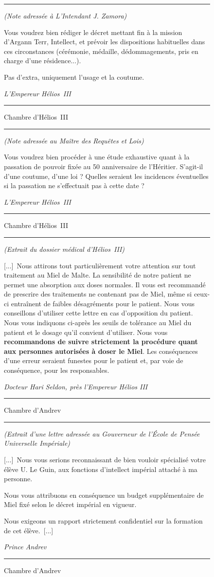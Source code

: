 \documentclass{article}
\newcommand{\newcharacter}{\clearpage\setcounter{figure}{0}}
\newcommand{\indice}[4]{
    \begin{figure}[H]
        \begin{center}
            \rule{0.5\textwidth}{1pt}
        \end{center}
        \begin{framed}
            \begin{samepage}
                \textit{#1}
                \nopagebreak

                #2

                \nopagebreak

                \hfill\textit{#3}
            \end{samepage}
        \end{framed}
        \caption{#4}
        \begin{center}
            \rule{0.5\textwidth}{1pt}
        \end{center}
    \end{figure}
}
\begin{document}
\indice
{(Note adressée à L'Intendant J. Zamora)}
{Vous voudrez bien rédiger le décret mettant fin à la mission d'Argann Terr,
Intellect, et prévoir les dispositions habituelles dans ces circonstances
(cérémonie, médaille, dédommagements, pris en charge d'une résidence...).

\nobreak

Pas d'extra, uniquement l'usage et la coutume.}
{L'Empereur Hélios~III}
{Chambre d'Hélios~III}

\indice
{(Note adressée au Maître des Requêtes et Lois)}
{Vous voudrez bien procéder à une étude exhaustive quant à la passation de
pouvoir fixée au 50\ieme{} anniversaire de l'Héritier. S'agit-il d'une coutume,
d'une loi ? Quelles seraient les incidences éventuelles si la passation
ne s'effectuait pas à cette date ?}
{L'Empereur Hélios~III}
{Chambre d'Hélios~III}

\newcharacter

\indice
{(Extrait du dossier médical d'Hélios~III)}
{[...]~Nous attirons tout particulièrement votre attention sur tout traitement
au Miel de Malte. La sensibilité de notre patient ne permet une absorption aux
doses normales. Il vous est recommandé de prescrire des traitements ne
contenant pas de Miel, même si ceux-ci entraînent de faibles désagréments pour
le patient. Nous vous conseillons d'utiliser cette lettre en cas d'opposition
du patient. Nous vous indiquons ci-après les seuils de tolérance au Miel du
patient et le dosage qu'il convient d'utiliser. Nous vous \textbf{recommandons
de suivre strictement la procédure quant aux personnes autorisées à doser le
Miel}. Les conséquences d'une erreur seraient funestes pour le patient et, par
voie de conséquence, pour les responsables.}
{Docteur Hari Seldon, près l'Empereur Hélios III}
{Chambre d'Andrev}

\indice
{(Extrait d'une lettre adressée au Gouverneur de l'École de Pensée Universelle
Impériale)}
{[...]~Nous vous serions reconnaissant de bien vouloir spécialisé votre élève
U. Le Guin, aux fonctions d'intellect impérial attaché à ma personne.

\nobreak

Nous vous attribuons en conséquence un budget supplémentaire de Miel fixé selon
le décret impérial en vigueur.

\nobreak

Nous exigeons un rapport strictement confidentiel sur la formation de cet
élève.~[...]}
{Prince Andrev}
{Chambre d'Andrev}
\end{document}
